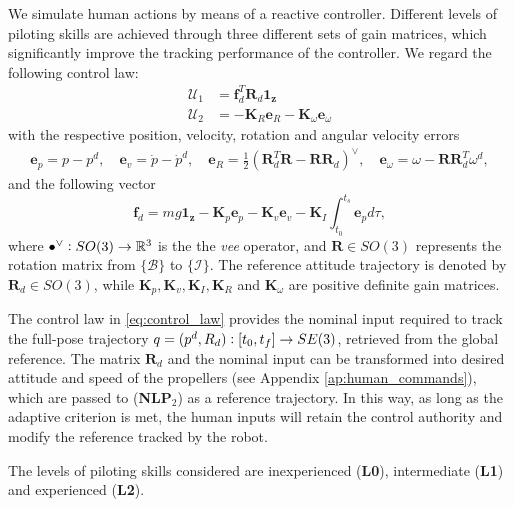 We simulate human actions by means of a reactive controller. Different levels of piloting skills are achieved through three different sets of gain matrices, which significantly improve the tracking performance of the controller. We regard the following control law:
\begin{equation}
\begin{aligned}
	\mathcal{U}_1 &= \mathbf{f}^T_d\mathbf{R}_d\mathbf{1_z}\\
	\mathcal{U}_2 &= - \mathbf{K}_R\mathbf{e}_R - \mathbf{K}_{\omega}\mathbf{e}_{\omega} \end{aligned}\label{eq:control_law}%
\end{equation}
with the respective position, velocity, rotation and angular velocity errors
\begin{equation*}
\begin{aligned}
	\mathbf{e}_p = p - p^d, \quad \mathbf{e}_v = \Dot{p}-\Dot{p}^d, \quad  \mathbf{e}_R = \frac{1}{2}(\mathbf{R}^T_d\mathbf{R}-\mathbf{R}\mathbf{R}_d)^\vee, \quad \mathbf{e}_{\omega} = \omega - \mathbf{R}\mathbf{R}^T_d\omega^d,
\end{aligned}
\end{equation*}
and the following vector
\begin{equation*}
	\mathbf{f}_d = mg\mathbf{1_z} - \mathbf{K}_p\mathbf{e}_p - \mathbf{K}_{v}\mathbf{e}_{v}  -\mathbf{K}_I \int_{t_0}^{t_s}\mathbf{e}_p d\tau,
\end{equation*}
where $\bullet^\vee \vcentcolon SO(3) \rightarrow \mathbb{R}^3$ is the the \emph{vee} operator, and $\mathbf{R} \in SO(3)$ represents the rotation matrix from $\{\mathcal{B}\}$ to $\{\mathcal{I}\}$. The reference attitude trajectory is denoted by $\mathbf{R}_d \in SO(3)$, while $\mathbf{K}_p, \mathbf{K}_v, \mathbf{K}_I, \mathbf{K}_R$ and $\mathbf{K}_{\omega}$ are positive definite gain matrices.

The control law in \eqref{eq:control_law} provides the nominal input required to track the full-pose trajectory $q = (p^d, R_d) \vcentcolon [t_0,t_f]\rightarrow SE(3)$, retrieved from the global reference. The matrix $\mathbf{R}_d$ and the nominal input can be transformed into desired attitude and speed of the propellers (see Appendix \ref{ap:human_commands}), which are passed to (\textbf {NLP$_2$}) as a reference trajectory. In this way, as long as the adaptive criterion is met, the human inputs will retain the control authority and modify the reference tracked by the robot.

The levels of piloting skills considered are inexperienced (\textbf{L0}), intermediate (\textbf{L1}) and experienced (\textbf{L2}).